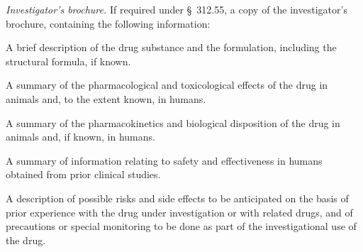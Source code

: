 \begin{description}[leftmargin=0.5cm,style=sameline]
\item[(5)] \textit{Investigator's brochure.} If required under \S~312.55, a copy of the investigator's brochure, containing the following information:
\begin{description}[leftmargin=0.8cm,style=sameline]
\item[(i)] A brief description of the drug substance and the formulation, including the structural formula, if known.
\item[(ii)] A summary of the pharmacological and toxicological effects of the drug in animals and, to the extent known, in humans.
\item[(iii)] A summary of the pharmacokinetics and biological disposition of the drug in animals and, if known, in humans.
\item[(iv)] A summary of information relating to safety and effectiveness in humans obtained from prior clinical studies.
\item[(v)] A description of possible risks and side effects to be anticipated on the basis of prior experience with the drug under investigation or with related drugs, and of precautions or special monitoring to be done as part of the investigational use of the drug.
\end{description}


\end{description}

